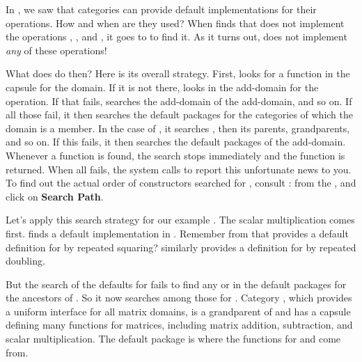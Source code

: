 {{{{{{{%
%
In , we saw that categories can provide
default implementations for their operations.
How and when are they used?
When \Language{} finds that
does not implement the operations \spadop{*},
\spadop{+}, and \spadop{-}, it goes to
 to find it.
As it turns out,  does
not implement {\it any} of these operations!

What does \Language{} do then?
Here is its overall strategy.
First, \Language{} looks for a function in the capsule for the domain.
If it is not there, \Language{} looks in the add-domain for the
operation.
If that fails, \Language{} searches the add-domain of the add-domain,
and so on.
If all those fail, it then searches the default packages for the
categories of which the domain is a member.
In the case of , it searches
, then its parents, grandparents, and
so on.
If this fails, it then searches the default packages of the
add-domain.
Whenever a function is found, the search stops immediately and the
function is returned.
When all fails, the system calls  to report this
unfortunate news to you.
To find out the actual order of constructors searched for
, consult \Browse{}: from the
, and click on {\bf Search Path}.

Let's apply this search strategy for our example .
The scalar multiplication comes first.
\Language{} finds a default implementation in
.
Remember from  that
 provides a default definition for
 by repeated squaring?
 similarly provides a definition for
 by repeated doubling.

But the search of the defaults for  fails
to find any \spadop{+} or \spadop{*} in the default packages for
the ancestors of .
So it now searches among those for .
Category , which provides a uniform interface
for all matrix domains,
is a grandparent of  and
has a capsule defining many functions for matrices, including
matrix addition, subtraction, and scalar multiplication.
The default package  is where the
functions for  and
 come from.

}}}}}}}
